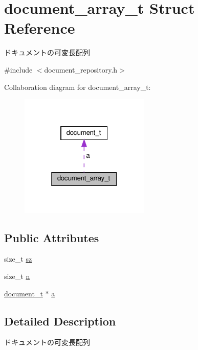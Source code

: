 \hypertarget{structdocument__array__t}{}\section{document\+\_\+array\+\_\+t Struct Reference}
\label{structdocument__array__t}


ドキュメントの可変長配列  




{\ttfamily \#include $<$document\+\_\+repository.\+h$>$}



Collaboration diagram for document\+\_\+array\+\_\+t\+:\nopagebreak
\begin{figure}[H]
\begin{center}
\leavevmode
\includegraphics[width=175pt]{structdocument__array__t__coll__graph}
\end{center}
\end{figure}
\subsection*{Public Attributes}
\begin{DoxyCompactItemize}
\item 
size\+\_\+t \hyperlink{structdocument__array__t_a80cf2efb148f704dedae66740b418bab}{sz}
\item 
size\+\_\+t \hyperlink{structdocument__array__t_a5ffc023dad1cae730d69ace33c2f4853}{n}
\item 
\hyperlink{structdocument__t}{document\+\_\+t} $\ast$ \hyperlink{structdocument__array__t_a78b00a75f138da85c3342bc4cbd14ee9}{a}
\end{DoxyCompactItemize}


\subsection{Detailed Description}
ドキュメントの可変長配列 

